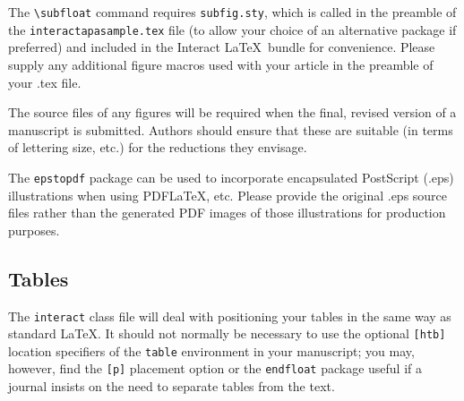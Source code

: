 \documentclass[]{interact}
\theoremstyle{plain}%
\theoremstyle{definition}
\theoremstyle{remark}
\begin{document}
The \verb"\subfloat" command requires \verb"subfig.sty", which is called in the preamble of the \texttt{interactapasample.tex} file (to allow your choice of an alternative package if preferred) and included in the \textsf{Interact} \LaTeX\ bundle for convenience. Please supply any additional figure macros used with your article in the preamble of your .tex file.

The source files of any figures will be required when the final, revised version of a manuscript is submitted. Authors should ensure that these are suitable (in terms of lettering size, etc.) for the reductions they envisage.

The \texttt{epstopdf} package can be used to incorporate encapsulated PostScript (.eps) illustrations when using PDF\LaTeX, etc. Please provide the original .eps source files rather than the generated PDF images of those illustrations for production purposes.


\subsection{Tables}

The \texttt{interact} class file will deal with positioning your tables in the same way as standard \LaTeX. It should not normally be necessary to use the optional \texttt{[htb]} location specifiers of the \texttt{table} environment in your manuscript; you may, however, find the \verb"[p]" placement option or the \verb"endfloat" package useful if a journal insists on the need to separate tables from the text.
\end{document}
